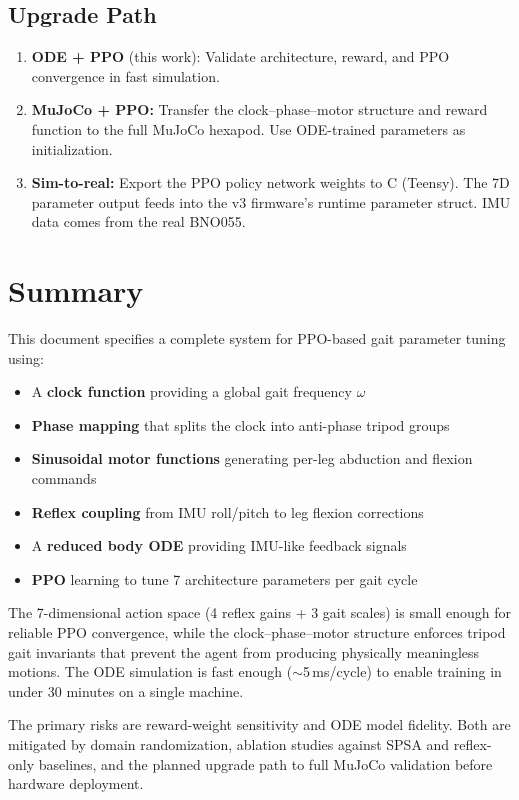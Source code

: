 \documentclass[11pt]{article}
\begin{document}
\subsection{Upgrade Path}

\begin{enumerate}
    \item \textbf{ODE + PPO} (this work): Validate architecture, reward, and PPO convergence in fast simulation.
    \item \textbf{MuJoCo + PPO:} Transfer the clock--phase--motor structure and reward function to the full MuJoCo hexapod. Use ODE-trained parameters as initialization.
    \item \textbf{Sim-to-real:} Export the PPO policy network weights to C (Teensy). The 7D parameter output feeds into the v3 firmware's runtime parameter struct. IMU data comes from the real BNO055.
\end{enumerate}

\section{Summary}

This document specifies a complete system for PPO-based gait parameter tuning using:
\begin{itemize}
    \item A \textbf{clock function} providing a global gait frequency $\omega$
    \item \textbf{Phase mapping} that splits the clock into anti-phase tripod groups
    \item \textbf{Sinusoidal motor functions} generating per-leg abduction and flexion commands
    \item \textbf{Reflex coupling} from IMU roll/pitch to leg flexion corrections
    \item A \textbf{reduced body ODE} providing IMU-like feedback signals
    \item \textbf{PPO} learning to tune 7 architecture parameters per gait cycle
\end{itemize}

The 7-dimensional action space (4 reflex gains + 3 gait scales) is small enough for reliable PPO convergence, while the clock--phase--motor structure enforces tripod gait invariants that prevent the agent from producing physically meaningless motions. The ODE simulation is fast enough ($\sim$5\,ms/cycle) to enable training in under 30 minutes on a single machine.

The primary risks are reward-weight sensitivity and ODE model fidelity. Both are mitigated by domain randomization, ablation studies against SPSA and reflex-only baselines, and the planned upgrade path to full MuJoCo validation before hardware deployment.
\end{document}
